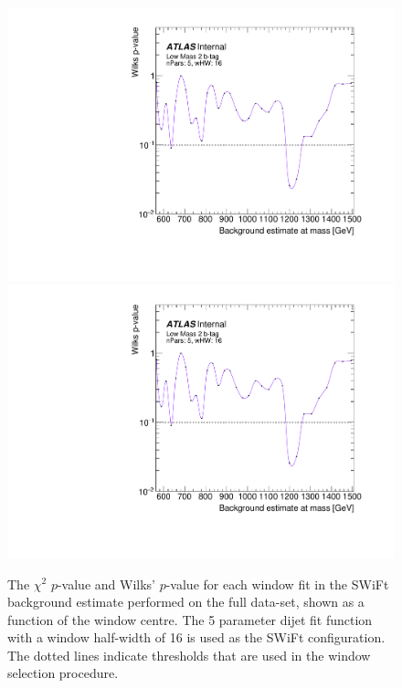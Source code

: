\vspace{-1mm}
\begin{figure}[!htb]
\captionsetup[subfigure]{aboveskip=0pt,justification=centering}
\centering
{} {
  \includegraphics[width=0.43\linewidth, angle=0,page=4]{figs/Dibjet/LowMass/FitStudy_min566/windowSel_unblind_just16.pdf}
}\hspace{-5mm}
 {
  \includegraphics[width=0.43\linewidth, angle=0,page=1]{figs/Dibjet/LowMass/FitStudy_min566/windowSel_unblind_just16.pdf}
}
\vspace{1pt}
\caption{\label{fig:windowSel_unblind_just16}
  The  $\chi^{2}$ \mbox{$p$-value} and Wilks' \mbox{$p$-value} for each window fit in the SWiFt background estimate
  performed on the full \lm{} data-set, shown as a function of the window centre.
  The 5 parameter dijet fit function with a window half-width of 16 is used as the SWiFt configuration.
  The dotted lines indicate thresholds that are used in the window selection procedure.
}
\end{figure}

